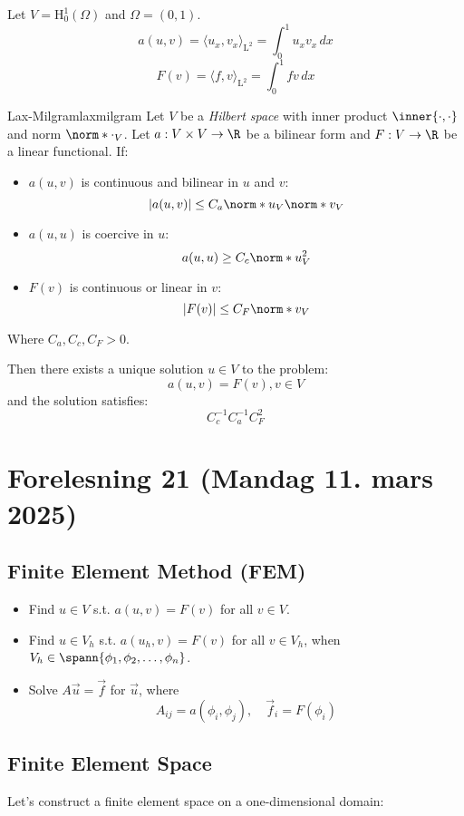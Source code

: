 Let \(V = \mathrm{H}^1_0 (\Omega)\) and \(\Omega = (0,1)\).
\[
  a(u,v) = \langle u_x, v_x \rangle_{\mathrm{L}^2} = \int_0^1 u_x v_x \,dx
\]
\[
  F(v) = \langle f, v \rangle_{\mathrm{L}^2} = \int_0^1 f v \,dx
\]
\begin{theorem}{Lax-Milgram}{laxmilgram}
  Let \(V\) be a \emph{Hilbert space} with inner product \(\inner{\cdot, \cdot}\) and norm \(\norm*{\cdot}_V\). Let \(a: V\times V\to \R\) be a bilinear form and \(F: V\to \R\) be a linear functional. If:
  \begin{itemize}
    \item \(a(u,v)\) is continuous and bilinear in \(u\) and \(v\):
          \[
            |a(u,v)| \leq C_a \norm*{u}_V\norm*{v}_V
          \]
    \item \(a(u,u)\) is coercive in \(u\):
          \[
            a(u,u) \geq C_c\norm*{u}_V^2
          \]
    \item \(F(v)\) is continuous or linear in \(v\):
          \[
            |F(v)| \leq C_F\norm*{v}_V
          \]
  \end{itemize}
  Where \(C_a, C_c, C_F > 0\).

  \medskip

  Then there exists a unique solution \(u\in V\) to the problem:
  \[
    a(u,v) = F(v), v\in V
  \]
  and the solution satisfies:
  \[
    C_c^{-1}C_a^{-1}C_F^2
  \]
\end{theorem}

\section{Forelesning 21 (Mandag 11. mars 2025)}

\subsection{Finite Element Method (FEM)}

\begin{itemize}
  \item Find $u\in V$ s.t. \(a(u,v) = F(v)\) for all \(v\in V\).
  \item Find $u\in V_h$ s.t. \(a(u_h,v) = F(v)\) for all \(v\in V_h\), when \(V_h\in\spann\{\phi_1,\phi_2,\dots,\phi_n\}\).
  \item Solve \(A\vec{u} = \vec{f}\) for \(\vec{u}\), where
        \[
          A_{ij} = a(\phi_i,\phi_j), \quad \vec{f}_i = F(\phi_i)
        \]
\end{itemize}

\subsection{Finite Element Space}
Let's construct a finite element space on a one-dimensional domain:

